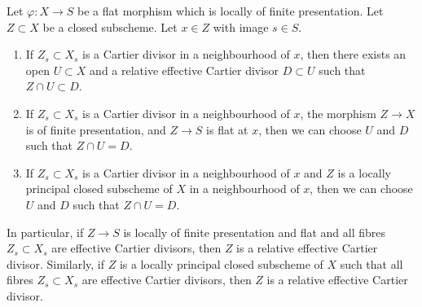 \begin{lemma}
\label{lemma-fibre-Cartier}
Let $\varphi : X \to S$ be a flat morphism which is locally of finite
presentation. Let $Z \subset X$ be a closed subscheme.
Let $x \in Z$ with image $s \in S$.
\begin{enumerate}
\item If $Z_s \subset X_s$ is a Cartier divisor in a neighbourhood of $x$,
then there exists an open $U \subset X$ and a
relative effective Cartier divisor $D \subset U$ such that
$Z \cap U \subset D$.
\item If $Z_s \subset X_s$ is a Cartier divisor in a neighbourhood of $x$,
the morphism $Z \to X$ is of finite presentation, and $Z \to S$ is flat at
$x$, then we can choose $U$ and $D$ such that $Z \cap U = D$.
\item If $Z_s \subset X_s$ is a Cartier divisor in a neighbourhood of $x$
and $Z$ is a locally principal closed subscheme of $X$ in a neighbourhood
of $x$, then we can choose $U$ and $D$ such that $Z \cap U = D$.
\end{enumerate}
In particular, if $Z \to S$ is locally of finite presentation and flat and
all fibres $Z_s \subset X_s$ are effective Cartier divisors, then
$Z$ is a relative effective Cartier divisor. Similarly, if $Z$
is a locally principal closed subscheme of $X$ such that all fibres
$Z_s \subset X_s$ are effective Cartier divisors, then
$Z$ is a relative effective Cartier divisor.
\end{lemma}

